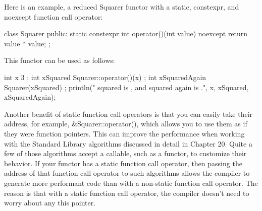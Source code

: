 Here is an example, a reduced Squarer functor with a static, constexpr, and noexcept function call operator:

\begin{cpp}
class Squarer
{
    public:
        static constexpr int operator()(int value) noexcept
        {
            return value * value;
        }
};
\end{cpp}

This functor can be used as follows:

\begin{cpp}
int x { 3 };
int xSquared { Squarer::operator()(x) };
int xSquaredAgain { Squarer{}(xSquared) };
println("{} squared is {}, and squared again is {}.", x, xSquared, xSquaredAgain);
\end{cpp}

Another benefit of static function call operators is that you can easily take their address, for example, \&Squarer::operator(), which allows you to use them as if they were function pointers. This can improve the performance when working with the Standard Library algorithms discussed in detail in Chapter 20. Quite a few of those algorithms accept a callable, such as a functor, to customize their behavior. If your functor has a static function call operator, then passing the address of that function call operator to such algorithms allows the compiler to generate more performant code than with a non-static function call operator. The reason is that with a static function call operator, the compiler doesn’t need to worry about any this pointer.






















